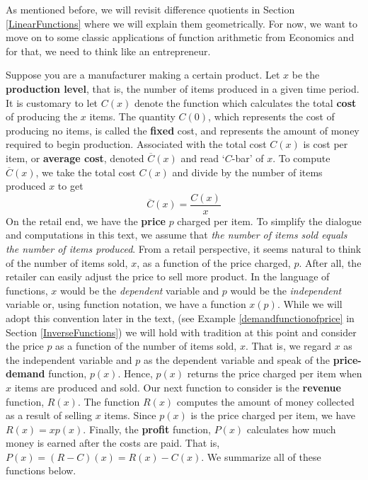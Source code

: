 \medskip

\label{diffquotgeompromise}

As mentioned before, we will revisit difference quotients in Section \ref{LinearFunctions} where we will explain them geometrically.  For now, we want to move on to some classic applications of function arithmetic from Economics and for that, we need to think like an entrepreneur.

\medskip

Suppose you are a manufacturer making a certain product. Let $x$ be the \textbf{production level}, that is, the number of items produced in a given time period. It is customary to let $C(x)$ denote the function which calculates the total \textbf{cost} of producing the $x$ items.  The quantity $C(0)$, which represents the cost of producing no items, is called the \textbf{fixed} cost, and represents the amount of money required to begin production. Associated with the total cost $C(x)$ is cost per item, or \textbf{average cost}, denoted $\overline{C}(x)$ and read `$C$-bar' of $x$.  To compute $\overline{C}(x)$,  we take the total cost $C(x)$ and divide by the number of items produced $x$ to get \[ \overline{C}(x) = \dfrac{C(x)}{x}\] On the retail end, we have the \textbf{price} $p$ charged per item.  To simplify the dialogue and computations in this text, we assume that \textit{the number of items sold equals the number of items produced}. From a retail perspective, it seems natural to think of the number of items sold, $x$, as a function of the price charged, $p$.  After all, the retailer can easily adjust the price to sell more product.  In the language of functions,  $x$ would be the \textit{dependent} variable and $p$ would be the \textit{independent} variable or, using function notation, we have a function $x(p)$.  While we will adopt this convention later in the text, (see Example \ref{demandfunctionofprice} in Section \ref{InverseFunctions}) we will hold with tradition at this point and consider the price $p$ as a function of the number of items sold, $x$.  That is, we regard $x$ as the independent variable and $p$ as the dependent variable and speak of the \textbf{price-demand} function, $p(x)$.  Hence, $p(x)$ returns the price charged per item when $x$ items are produced and sold.   Our next function to consider is the \textbf{revenue} function, $R(x)$.  The function $R(x)$ computes the amount of money collected as a result of selling $x$ items.  Since $p(x)$ is the price charged per item, we have $R(x)= x p(x)$.  Finally, the \textbf{profit} function, $P(x)$ calculates how much money is earned after the costs are paid.  That is, $P(x) = (R-C)(x) = R(x) - C(x)$.  We summarize all of these functions below.

